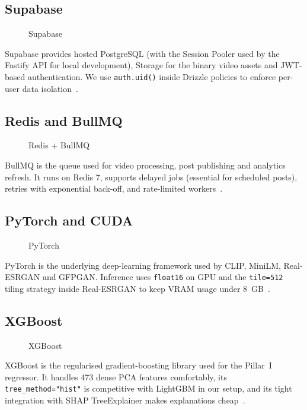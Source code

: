 \subsection{Supabase}
\label{sec:supabase}
\begin{figure}[H]
  \centering
  \caption{Supabase}
  \label{fig:supabase}
\end{figure}
Supabase provides hosted PostgreSQL (with the Session Pooler used by the Fastify API for
local development), Storage for the binary video assets and JWT-based authentication. We
use \texttt{auth.uid()} inside Drizzle policies to enforce per-user data isolation~\cite{supabase}.

\subsection{Redis and BullMQ}
\label{sec:bullmq}
\begin{figure}[H]
  \centering
  \caption{Redis + BullMQ}
  \label{fig:bullmq}
\end{figure}
BullMQ is the queue used for video processing, post publishing and analytics refresh. It
runs on Redis 7, supports delayed jobs (essential for scheduled posts), retries with
exponential back-off, and rate-limited workers~\cite{bullmq}.

\subsection{PyTorch and CUDA}
\label{sec:torch}
\begin{figure}[H]
  \centering
  \caption{PyTorch}
  \label{fig:torch}
\end{figure}
PyTorch is the underlying deep-learning framework used by CLIP, MiniLM, Real-ESRGAN and
GFPGAN. Inference uses \texttt{float16} on GPU and the \texttt{tile=512} tiling strategy
inside Real-ESRGAN to keep VRAM usage under 8~GB~\cite{pytorch}.

\subsection{XGBoost}
\label{sec:xgb}
\begin{figure}[H]
  \centering
  \caption{XGBoost}
  \label{fig:xgb}
\end{figure}
XGBoost is the regularised gradient-boosting library used for the Pillar~I regressor. It
handles 473 dense PCA features comfortably, its \texttt{tree\_method="hist"} is competitive
with LightGBM in our setup, and its tight integration with SHAP TreeExplainer makes
explanations cheap~\cite{xgboost}.

